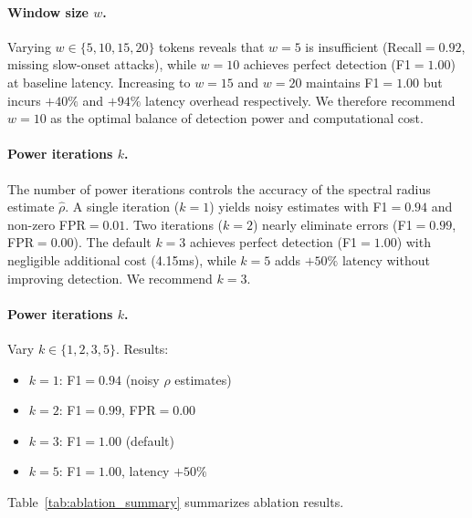 \documentclass[10pt,twocolumn]{article}
\begin{document}
\paragraph{Window size $w$.}
Varying $w \in \{5, 10, 15, 20\}$ tokens reveals that $w{=}5$ is insufficient (Recall$=0.92$, missing slow-onset attacks), while $w{=}10$ achieves perfect detection (F1$=1.00$) at baseline latency. Increasing to $w{=}15$ and $w{=}20$ maintains F1$=1.00$ but incurs $+40\%$ and $+94\%$ latency overhead respectively. We therefore recommend $w{=}10$ as the optimal balance of detection power and computational cost.

\paragraph{Power iterations $k$.}
The number of power iterations controls the accuracy of the spectral radius estimate $\hat{\rho}$. A single iteration ($k{=}1$) yields noisy estimates with F1$=0.94$ and non-zero FPR$=0.01$. Two iterations ($k{=}2$) nearly eliminate errors (F1$=0.99$, FPR$=0.00$). The default $k{=}3$ achieves perfect detection (F1$=1.00$) with negligible additional cost (4.15ms), while $k{=}5$ adds $+50\%$ latency without improving detection. We recommend $k{=}3$.

\paragraph{Power iterations $k$.}
Vary $k \in \{1, 2, 3, 5\}$. Results:
\begin{itemize}
\item $k=1$: F1$=0.94$ (noisy $\rho$ estimates)
\item $k=2$: F1$=0.99$, FPR$=0.00$
\item $k=3$: F1$=1.00$ (default)
\item $k=5$: F1$=1.00$, latency $+50\%$
\end{itemize}

Table~\ref{tab:ablation_summary} summarizes ablation results.
\end{document}

